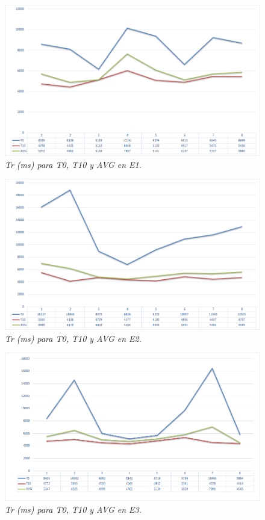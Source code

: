 \begin{figure}[H]
  \centering
  \includegraphics[scale=.7]{images/Figura5-12}
  \caption{\em Tr (ms) para T0, T10 y AVG en E1.}
  \label{fig:exp-im12}
\end{figure}

\begin{figure}[H]
  \centering
  \includegraphics[scale=.7]{images/Figura5-13}
  \caption{\em Tr (ms) para T0, T10 y AVG en E2.}
  \label{fig:exp-im13}
\end{figure}

\begin{figure}[H]
  \centering
  \includegraphics[scale=.7]{images/Figura5-14}
  \caption{\em Tr (ms) para T0, T10 y AVG en E3.}
  \label{fig:exp-im14}
\end{figure}

